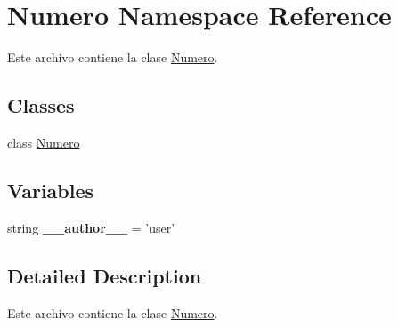 \hypertarget{namespace_numero}{\section{Numero Namespace Reference}
\label{namespace_numero}
}


Este archivo contiene la clase \hyperlink{namespace_numero}{Numero}.  


\subsection*{Classes}
\begin{DoxyCompactItemize}
\item 
class \hyperlink{class_numero_1_1_numero}{Numero}
\end{DoxyCompactItemize}
\subsection*{Variables}
\begin{DoxyCompactItemize}
\item 
\hypertarget{namespace_numero_a9532b284867554352445fe666632c1cb}{string {\bfseries \-\_\-\-\_\-author\-\_\-\-\_\-} = 'user'}\label{namespace_numero_a9532b284867554352445fe666632c1cb}

\end{DoxyCompactItemize}


\subsection{Detailed Description}
Este archivo contiene la clase \hyperlink{namespace_numero}{Numero}. 